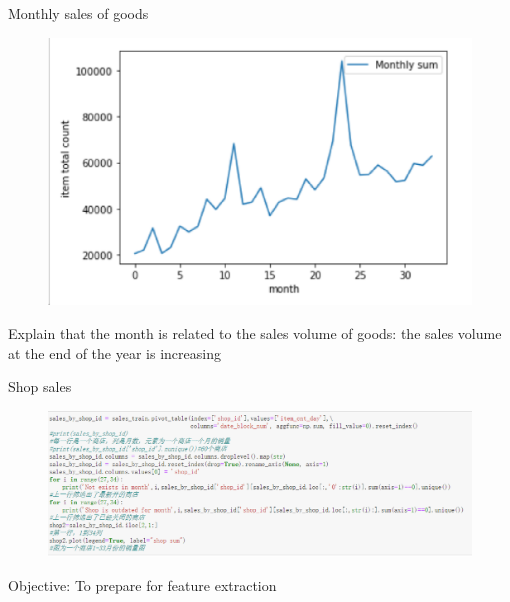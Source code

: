 \documentclass[
 size=14pt,
 paper=smartboard,  %
 mode=present, 		%
 display=slides, 	%
 style=tuliplab,  	%
 pauseslide,
 fleqn,leqno]{powerdot}
\begin{document}
\begin{slide}[toc=,bm=]{Monthly sales of goods}
  \begin{figure}
    \includegraphics[scale=0.5]{picture/data_20.eps}
  \end{figure}
    Explain that the month is related to the sales volume of goods: the sales volume at the end of the year is increasing
\end{slide}


\begin{slide}[toc=,bm=]{Shop sales}
  \begin{figure}
    \includegraphics[scale=0.5]{picture/data_10.eps}
  \end{figure}
  \begin{center}
    Objective: To prepare for feature extraction
  \end{center}
\end{slide}
\end{document}
